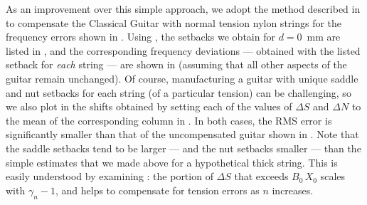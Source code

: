 
As an improvement over this simple approach, we adopt the method described in  to compensate the Classical Guitar with normal tension nylon strings for the frequency errors shown in . Using , the setbacks we obtain for $d = 0$~mm are listed in , and the corresponding frequency deviations --- obtained with the listed setback for \emph{each} string --- are shown in  (assuming that all other aspects of the guitar remain unchanged). Of course, manufacturing a guitar with unique saddle and nut setbacks for each string (of a particular tension) can be challenging, so we also plot in  the shifts obtained by setting each of the values of $\Delta S$ and $\Delta N$ to the mean of the corresponding column in  . In both cases, the RMS error is significantly smaller than that of the uncompensated guitar shown in . Note that the saddle setbacks tend to be larger --- and the nut setbacks smaller --- than the simple estimates that we made above for a hypothetical thick string. This is easily understood by examining : the portion of $\Delta S$ that exceeds $B_0\, X_0$ scales with $\gamma_n - 1$, and helps to compensate for tension errors as $n$ increases.

